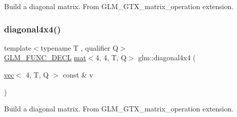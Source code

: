 Build a diagonal matrix. From G\+L\+M\+\_\+\+G\+T\+X\+\_\+matrix\+\_\+operation extension. \mbox{\label{group__gtx__matrix__operation_ga0b4cd8dea436791b072356231ee8578f}} 
\subsubsection{\texorpdfstring{diagonal4x4()}{diagonal4x4()}}
{\footnotesize\ttfamily template$<$typename T , qualifier Q$>$ \\
\hyperlink{setup_8hpp_ab2d052de21a70539923e9bcbf6e83a51}{G\+L\+M\+\_\+\+F\+U\+N\+C\+\_\+\+D\+E\+CL} \hyperlink{structglm_1_1mat}{mat}$<$4, 4, T, Q$>$ glm\+::diagonal4x4 (\begin{DoxyParamCaption}\item[{\hyperlink{structglm_1_1vec}{vec}$<$ 4, T, Q $>$ const \&}]{v }\end{DoxyParamCaption})}

Build a diagonal matrix. From G\+L\+M\+\_\+\+G\+T\+X\+\_\+matrix\+\_\+operation extension. 